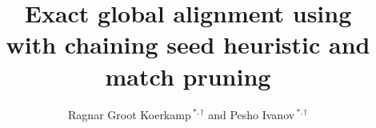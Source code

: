 \documentclass[nocrop]{bioinfo}
\begin{document}

\subtitle{}

\title[Exact global alignment using \A]{Exact global alignment using \A\\ with chaining seed heuristic and match pruning}
\author[R. {Groot Koerkamp} and P. Ivanov]{Ragnar {Groot Koerkamp}\,$^{*,\dagger}$ and Pesho Ivanov\,$^{*,\dagger}$} %
\address{Department of Computer Science, ETH Zurich, Switzerland}%


\history{}

\editor{}


\maketitle








%





\clearpage
\appendix
\renewcommand{\thesection}{\Alph{section}}

\end{document}
